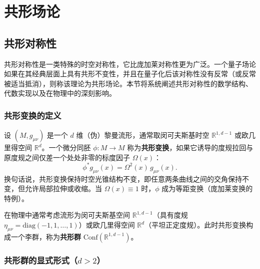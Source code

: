 \chapter{共形场论}
\section{共形对称性}



共形对称性是一类特殊的时空对称性，它比庞加莱对称性更为广泛。一个量子场论如果在其经典层面上具有共形不变性，并且在量子化后该对称性没有反常（或反常被适当抵消），则称该理论为共形场论。本节将系统阐述共形对称性的数学结构、代数实现以及在物理中的深刻影响。

\subsection*{共形变换的定义}

设 $(M,g_{\mu\nu})$ 是一个 $d$ 维（伪）黎曼流形，通常取闵可夫斯基时空 $\mathbb{R}^{1,d-1}$ 或欧几里得空间 $\mathbb{R}^d$。一个微分同胚 $\phi: M \to M$ 称为\textbf{共形变换}，如果它诱导的度规拉回与原度规之间仅差一个处处非零的标度因子 $\Omega(x)$：
\begin{equation}
\phi^* g_{\mu\nu}(x) = \Omega^2(x)\, g_{\mu\nu}(x).
\label{eq:conformal}
\end{equation}
换句话说，共形变换保持时空光锥结构不变，即任意两条曲线之间的交角保持不变，但允许局部拉伸或收缩。当 $\Omega(x) \equiv 1$ 时，$\phi$ 成为等距变换（庞加莱变换的特例）。

在物理中通常考虑流形为闵可夫斯基空间 $\mathbb{R}^{1,d-1}$（具有度规 $\eta_{\mu\nu} = \mathrm{diag}(-1,1,\dots,1)$）或欧几里得空间 $\mathbb{R}^d$（平坦正定度规）。此时共形变换构成一个李群，称为\textbf{共形群} $\mathrm{Conf}(\mathbb{R}^{1,d-1})$。

\subsection*{共形群的显式形式（$d>2$）}

